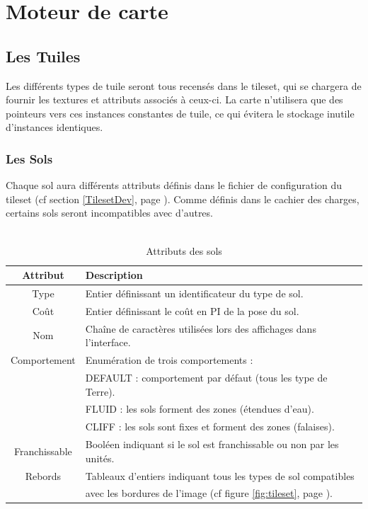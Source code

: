 \documentclass[a4paper]{memoir}
\begin{document}
		\section{Moteur de carte}
			\subsection{Les Tuiles}
				Les différents types de tuile seront tous recensés dans le tileset, qui se chargera de fournir les textures et attributs associés à ceux-ci. La carte n'utilisera que des pointeurs vers ces instances constantes de tuile, ce    qui évitera le stockage inutile d'instances identiques.
				
				\subsubsection{Les Sols}
					Chaque sol aura différents attributs définis dans le fichier de configuration du tileset (cf section \ref{TilesetDev}, page \pageref{TilesetDev}). Comme définis dans le cachier des charges, certains sols seront incompatibles avec d'autres.\\
					\\
					\begin{table}[H]
						\begin{small}
							\begin{tabular}{| c | l |}
								\hline
								\textbf{Attribut} & \textbf{Description}\\
								\hline
								Type & Entier définissant un identificateur du type de sol.\\
								\hline
								Coût & Entier définissant le coût en PI de la pose du sol.\\
								\hline
								Nom & Chaîne de caractères utilisées lors des affichages dans l'interface.\\
								\hline
								Comportement & Enumération de trois comportements :\\
								& DEFAULT : comportement par défaut (tous les type de Terre).\\
								& FLUID : les sols forment des zones (étendues d'eau).\\
								& CLIFF : les sols sont fixes et forment des zones (falaises).\\
								\hline
								Franchissable & Booléen indiquant si le sol est franchissable ou non par les unités.\\
								\hline
								Rebords & Tableaux d'entiers indiquant tous les types de sol compatibles\\
								& avec les bordures de l'image (cf figure \ref{fig:tileset}, page \pageref{fig:tileset}).\\
								\hline
							\end{tabular}
						\end{small}
						\label{tab:sol}
						\caption{Attributs des sols}
					\end{table}
					
\end{document}
